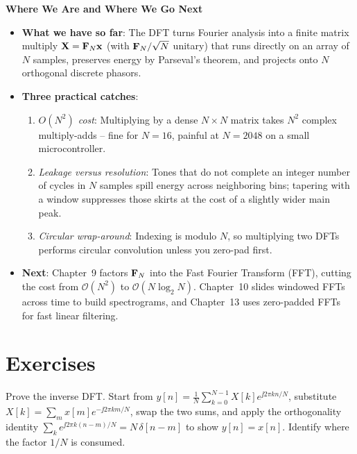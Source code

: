 \begin{connectionbox}
\textbf{Where We Are and Where We Go Next}
\begin{itemize}
  \item \textbf{What we have so far}: The DFT turns Fourier analysis into a finite matrix multiply
  $\mathbf{X} = \mathbf{F}_N \mathbf{x}$ (with $\mathbf{F}_N/\sqrt{N}$ unitary) that runs directly on an array
  of $N$ samples, preserves energy by Parseval's theorem, and projects onto $N$ orthogonal discrete
  phasors.
  \item \textbf{Three practical catches}:
  \begin{enumerate}
    \item \emph{$O(N^2)$ cost}: Multiplying by a dense $N\times N$ matrix takes $N^2$ complex
    multiply-adds -- fine for $N=16$, painful at $N=2048$ on a small microcontroller.
    \item \emph{Leakage versus resolution}: Tones that do not complete an integer number of cycles in
    $N$ samples spill energy across neighboring bins; tapering with a window suppresses those skirts
    at the cost of a slightly wider main peak.
    \item \emph{Circular wrap-around}: Indexing is modulo $N$, so multiplying two DFTs performs
    circular convolution unless you zero-pad first.
  \end{enumerate}
  \item \textbf{Next}: Chapter~9 factors $\mathbf{F}_N$ into the Fast Fourier Transform (FFT), cutting
  the cost from $\mathcal{O}(N^2)$ to $\mathcal{O}(N\log_2 N)$. Chapter~10 slides windowed FFTs
  across time to build spectrograms, and Chapter~13 uses zero-padded FFTs for fast linear filtering.
\end{itemize}
\end{connectionbox}

\section{Exercises}
\label{ch08:exercises}

\begin{exercise}
\label{ch08:ex-prove-inverse}
Prove the inverse DFT. Start from $y[n] = \frac{1}{N}\sum_{k=0}^{N-1} X[k]
e^{\jj 2\pi kn/N}$, substitute $X[k] = \sum_{m} x[m] e^{-\jj 2\pi km/N}$, swap the
two sums, and apply the orthogonality identity
$\sum_{k} e^{\jj 2\pi k(n-m)/N} = N\,\delta[n-m]$ to show $y[n] = x[n]$. Identify
where the factor $1/N$ is consumed.
\end{exercise}

